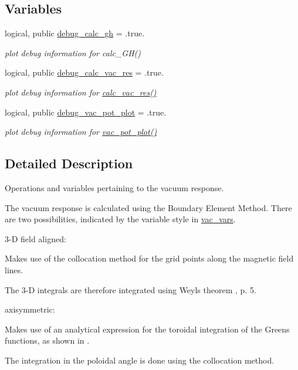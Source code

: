 \subsection*{Variables}
\begin{DoxyCompactItemize}
\item 
logical, public \hyperlink{namespacevac__ops_a9c1d2227ea0118cb9158f7e08f41affc}{debug\+\_\+calc\+\_\+gh} = .true.
\begin{DoxyCompactList}\small\item\em plot debug information for calc\+\_\+\+G\+H() \end{DoxyCompactList}\item 
logical, public \hyperlink{namespacevac__ops_a6b99f921f077f63f641d5a9c86d88eaf}{debug\+\_\+calc\+\_\+vac\+\_\+res} = .true.
\begin{DoxyCompactList}\small\item\em plot debug information for \hyperlink{namespacevac__ops_a5e5a8322b3aa2e3704b1050426f06d9d}{calc\+\_\+vac\+\_\+res()} \end{DoxyCompactList}\item 
logical, public \hyperlink{namespacevac__ops_a1afb20e30f5f99547fc8df4ace204ee9}{debug\+\_\+vac\+\_\+pot\+\_\+plot} = .true.
\begin{DoxyCompactList}\small\item\em plot debug information for \hyperlink{namespacevac__ops_a3a2a3aed45951aecef42197b82a5a6da}{vac\+\_\+pot\+\_\+plot()} \end{DoxyCompactList}\end{DoxyCompactItemize}


\subsection{Detailed Description}
Operations and variables pertaining to the vacuum response. 

The vacuum response is calculated using the Boundary Element Method. There are two possibilities, indicated by the variable {\ttfamily style} in {\ttfamily \hyperlink{namespacevac__vars}{vac\+\_\+vars}}.
\begin{DoxyEnumerate}
\item 3-\/D field aligned\+:
\begin{DoxyItemize}
\item Makes use of the collocation method for the grid points along the magnetic field lines.
\item The 3-\/D integrals are therefore integrated using Weyl\textquotesingle{}s theorem \cite{Helander2014}, p. 5.
\end{DoxyItemize}
\item axisymmetric\+:
\begin{DoxyItemize}
\item Makes use of an analytical expression for the toroidal integration of the Green\textquotesingle{}s functions, as shown in \cite{Cohl1999}.
\item The integration in the poloidal angle is done using the collocation method.
\end{DoxyItemize}
\end{DoxyEnumerate}

